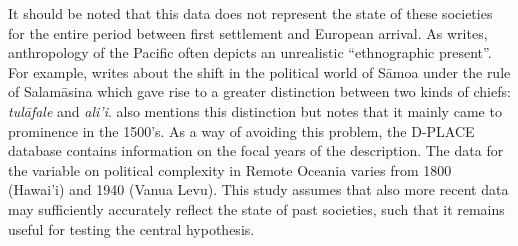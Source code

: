 \documentclass[unnumsec,webpdf,modern,medium]{oup-authoring-template}
\begin{document}
\begin{appendices}



It should be noted that this data does not represent the state of these societies for the entire period between first settlement and European arrival. As \citet{meleisea1995} writes, anthropology of the Pacific often depicts an unrealistic ``ethnographic present''. For example, \citet[185]{schoeffel87} writes about the shift in the political world of S\={a}moa under the rule of Salam\={a}sina which gave rise to a greater distinction between two kinds of chiefs: \emph{tul\={a}fale} and \emph{ali'i}. \citet[249]{kirch2017road} also mentions this distinction but notes that it mainly came to prominence in the 1500's. As a way of avoiding this problem, the D-PLACE database \citep{d_place_all} contains information on the focal years of the description. The data for the variable on political complexity in Remote Oceania varies from 1800 (Hawai'i) and 1940 (Vanua Levu). This study assumes that also more recent data may sufficiently accurately reflect the state of past societies, such that it remains useful for testing the central hypothesis.


\end{appendices}
\end{document}
